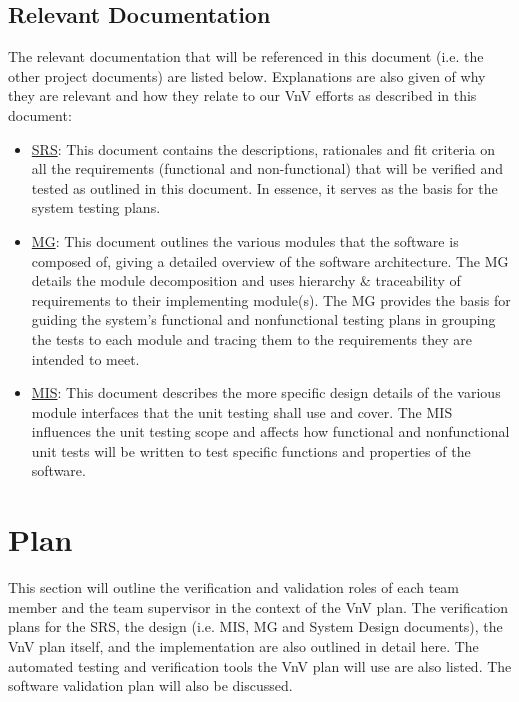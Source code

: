\documentclass[12pt, titlepage]{article}
\begin{document}
\subsection{Relevant Documentation}
The relevant documentation that will be referenced in this document (i.e. the other project documents) are listed below. Explanations are also given of why they are relevant and how they relate to our VnV efforts as described in this document:
\begin{itemize}
    \item \href{https://github.com/Tusharagg1/chest-x-ray-ai/blob/main/docs/SRS/SRS.pdf}{SRS}: This document contains the descriptions, rationales and fit criteria on all the requirements (functional and non-functional) that will be verified and tested as outlined in this document. In essence, it serves as the basis for the system testing plans.
    \item \href{https://github.com/Tusharagg1/chest-x-ray-ai/blob/main/docs/Design/SoftArchitecture/MG.pdf}{MG}: This document outlines the various modules that the software is composed of, giving a detailed overview of the software architecture. The MG details the module decomposition and uses hierarchy \& traceability of requirements to their implementing module(s). The MG provides the basis for guiding the system's functional and nonfunctional testing plans in grouping the tests to each module and tracing them to the requirements they are intended to meet.
    \item \href{https://github.com/Tusharagg1/chest-x-ray-ai/blob/main/docs/Design/SoftDetailedDes/MIS.pdf}{MIS}: This document describes the more specific design details of the various module interfaces that the unit testing shall use and cover. The MIS influences the unit testing scope and affects how functional and nonfunctional unit tests will be written to test specific functions and properties of the software.
\end{itemize}

\section{Plan}
This section will outline the verification and validation roles of each team member and the team supervisor in the context of the VnV plan. The verification plans for the SRS, the design (i.e. MIS, MG and System Design documents), the VnV plan itself, and the implementation are also outlined in detail here. The automated testing and verification tools the VnV plan will use are also listed. The software validation plan will also be discussed.
\end{document}
